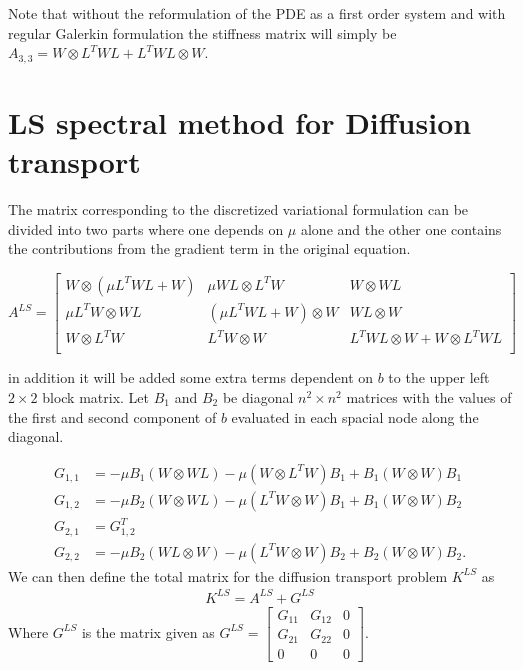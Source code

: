 Note that without the reformulation of the PDE as a first order system and with regular Galerkin formulation the stiffness matrix will simply be 
$A_{3,3} = W \otimes L^TWL+ L^TWL \otimes W$.
\section{LS spectral method for Diffusion transport}
The matrix corresponding to the discretized variational formulation can be divided into two parts where one depends on $\mu$ alone and the other one contains the contributions from the gradient term in the original equation. 

$
A^{LS} = 
\begin{bmatrix}
	W \otimes (\mu L^TWL+W) & \mu WL \otimes L^TW 		 &	W \otimes WL  \\ 	
	\mu L^TW \otimes WL     & (\mu L^TWL+W) \otimes W  &	WL \otimes W  \\ 	
	W \otimes L^TW		  & L^TW \otimes W       &  L^TWL \otimes W +	W\otimes L^TWL  \\ 	
\end{bmatrix}
$

in addition it will be added some extra terms dependent on $b$ to the upper left $2 \times 2$ block matrix. Let $B_1$ and $B_2$ be diagonal $n^2 \times n^2$ matrices with the values of the first and second component of $b$ evaluated in each spacial node along the diagonal.  

\begin{align}
	G_{1,1} &= -\mu B_1 (W \otimes WL) -\mu( W \otimes L^TW) B_1 + B_1( W\otimes W) B_1 \\ 	
	G_{1,2} &= -\mu B_2 (W \otimes WL) -\mu (L^TW \otimes W) B_1 + B_1 (W\otimes W) B_2 \\
	G_{2,1} &= G_{1,2}^T \\
	G_{2,2} &= -\mu B_2 (WL \otimes W) -\mu (L^TW \otimes W) B_2 + B_2 (W\otimes W) B_2. 
	\label{eq:additionalMatrixDiffTrans}
\end{align}
%
We can then define the total matrix for the diffusion transport problem $K^{LS}$ as
\begin{align}
K^{LS} = A^{LS} + G^{LS}
	\label{eq:difftransMatrixSum}
\end{align}
Where $G^{LS}$ is the matrix given as 
$
G^{LS}=
\begin{bmatrix}
	G_{11} & G_{12} &0 \\
	G_{21} & G_{22} &0 \\
	0 & 0 & 0 
\end{bmatrix}.
$
%

